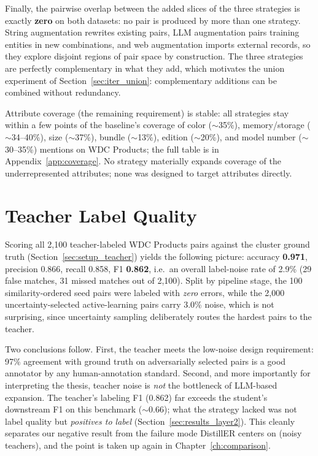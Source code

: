 \documentclass[a4paper,oneside,bibliography=totoc]{scrbook}
\begin{document}
Finally, the pairwise overlap between the added slices of the three strategies is exactly \textbf{zero} on both datasets: no pair is produced by more than one strategy. String augmentation rewrites existing pairs, LLM augmentation pairs training entities in new combinations, and web augmentation imports external records, so they explore disjoint regions of pair space by construction. The three strategies are perfectly complementary in what they add, which motivates the union experiment of Section~\ref{sec:iter_union}: complementary additions can be combined without redundancy.

Attribute coverage (the remaining requirement) is stable: all strategies stay within a few points of the baseline's coverage of color ($\sim$35\%), memory/storage ($\sim$34--40\%), size ($\sim$37\%), bundle ($\sim$13\%), edition ($\sim$20\%), and model number ($\sim$30--35\%) mentions on WDC Products; the full table is in Appendix~\ref{app:coverage}. No strategy materially expands coverage of the underrepresented attributes; none was designed to target attributes directly.

\section{Teacher Label Quality}
\label{sec:results_teacher}

Scoring all 2{,}100 teacher-labeled WDC Products pairs against the cluster ground truth (Section~\ref{sec:setup_teacher}) yields the following picture: accuracy \textbf{0.971}, precision 0.866, recall 0.858, F1 \textbf{0.862}, i.e.\ an overall label-noise rate of 2.9\% (29 false matches, 31 missed matches out of 2{,}100). Split by pipeline stage, the 100 similarity-ordered seed pairs were labeled with \emph{zero} errors, while the 2{,}000 uncertainty-selected active-learning pairs carry 3.0\% noise, which is not surprising, since uncertainty sampling deliberately routes the hardest pairs to the teacher.

Two conclusions follow. First, the teacher meets the low-noise design requirement: 97\% agreement with ground truth on adversarially selected pairs is a good annotator by any human-annotation standard. Second, and more importantly for interpreting the thesis, teacher noise is \emph{not} the bottleneck of LLM-based expansion. The teacher's labeling F1 (0.862) far exceeds the student's downstream F1 on this benchmark ($\sim$0.66); what the strategy lacked was not label quality but \emph{positives to label} (Section~\ref{sec:results_layer2}). This cleanly separates our negative result from the failure mode DistillER centers on (noisy teachers), and the point is taken up again in Chapter~\ref{ch:comparison}.
\end{document}
